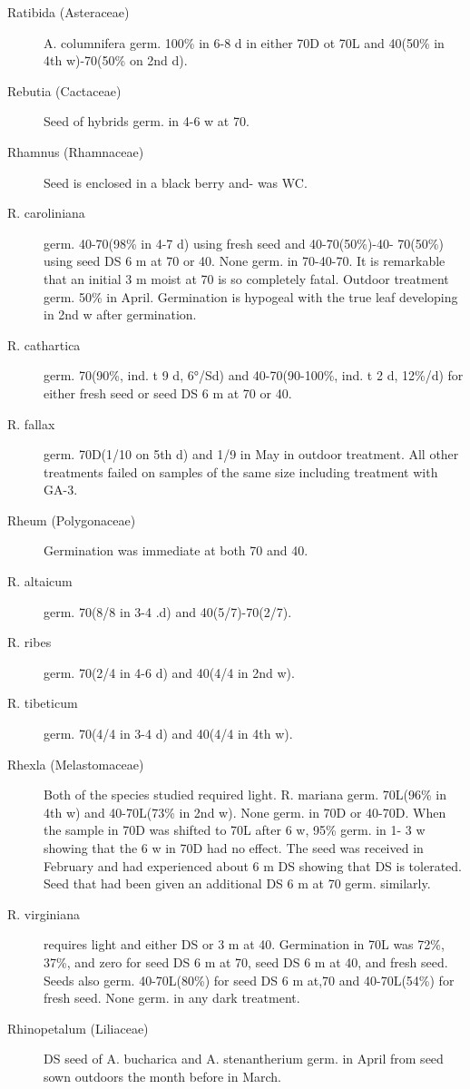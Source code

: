 \begin{description}
\item[Ratibida (Asteraceae)] A. columnifera germ. 100\% in 6-8 d in either 70D ot
70L and 40(50\% in 4th w)-70(50\% on 2nd d).

\item[Rebutia (Cactaceae)] Seed of hybrids germ. in 4-6 w at 70.

\item[Rhamnus (Rhamnaceae)] Seed is enclosed in a black berry and- was WC.
\item[R. caroliniana] germ. 40-70(98\% in 4-7 d) using fresh seed and 40-70(50\%)-40-
70(50\%) using seed DS 6 m at 70 or 40. None germ. in 70-40-70. It is remarkable that
an initial 3 m moist at 70 is so completely fatal. Outdoor treatment germ. 50\% in April.
Germination is hypogeal with the true leaf developing in 2nd w after germination.
\item[R. cathartica] germ. 70(90\%, ind. t 9 d, 6°/Sd) and 40-70(90-100\%, ind. t 2 d,
12\%/d) for either fresh seed or seed DS 6 m at 70 or 40.
\item[R. fallax] germ. 70D(1/10 on 5th d) and 1/9 in May in outdoor treatment. All other
treatments failed on samples of the same size including treatment with GA-3.

\item[Rheum (Polygonaceae)] Germination was immediate at both 70 and 40.
\item[R. altaicum] germ. 70(8/8 in 3-4 .d) and 40(5/7)-70(2/7).
\item[R. ribes] germ. 70(2/4 in 4-6 d) and 40(4/4 in 2nd w).
\item[R. tibeticum] germ. 70(4/4 in 3-4 d) and 40(4/4 in 4th w).
\item[Rhexla (Melastomaceae)] Both of the species studied required light.
R. mariana germ. 70L(96\% in 4th w) and 40-70L(73\% in 2nd w). None germ. in
70D or 40-70D. When the sample in 70D was shifted to 70L after 6 w, 95\% germ. in 1-
3 w showing that the 6 w in 70D had no effect. The seed was received in February
and had experienced about 6 m DS showing that DS is tolerated. Seed that had been
given an additional DS 6 m at 70 germ. similarly.
\item[R. virginiana] requires light and either DS or 3 m at 40. Germination in 70L was
72\%, 37\%, and zero for seed DS 6 m at 70, seed DS 6 m at 40, and fresh seed.
Seeds also germ. 40-70L(80\%) for seed DS 6 m at,70 and 40-70L(54\%) for fresh
seed. None germ. in any dark treatment.

\item[Rhinopetalum (Liliaceae)] DS seed of A. bucharica and A. stenantherium
germ. in April from seed sown outdoors the month before in March.


\end{description}
